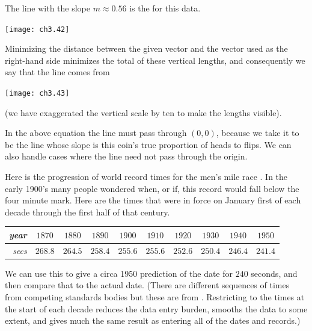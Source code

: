 The line with the slope \( m\approx 0.56 \)
is the %
for this data.
\begin{center}  \small
  \texttt{[image: ch3.42]}
\end{center}
Minimizing the distance
between the given vector and the vector used as the right-hand side
minimizes the total of these vertical lengths,
and consequently
we say that the line comes from
\begin{center}  \small
  \texttt{[image: ch3.43]}
\end{center}
(we have exaggerated the vertical scale by ten
to make the lengths visible).

In the above equation the line 
must pass through \( (0,0) \),
because we take it to be
the line whose slope is this coin's true proportion
of heads to flips. 
We can also handle cases where the line need not
pass through the origin.

Here is
the progression of world record times for the men's mile race \cite{Oakley}.
In the early 1900's many people wondered when, or if, 
this record would fall below the four minute mark.
Here are the times that were in force on January first
of each decade through the first half of that century.
\begin{center} \small
  \begin{tabular}{r|ccccccccc}
    \textit{year} &$1870$ &$1880$ &$1890$  &$1900$  
        &$1910$  &$1920$  &$1930$ &$1940$ &$1950$   \\
    \hline
    \textit{secs}  &$268.8$  &$264.5$  &$258.4$  &$255.6$  
        &$255.6$  &$252.6$  &$250.4$ &$246.4$ &$241.4$
  \end{tabular}  
\end{center}
We can use this to give a circa 1950 prediction of the date for $240$ seconds, 
and then compare that to the actual date.
(There are different sequences of times from competing standards
bodies but these are from \cite{WikipediaMensMile}.
Restricting to the times at the start of 
each decade reduces the data entry burden, smooths the data to some extent, 
and gives much the same result as entering all of the dates and records.)

